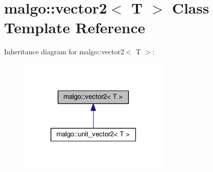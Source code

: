 \hypertarget{classmalgo_1_1vector2}{}\section{malgo\+:\+:vector2$<$ T $>$ Class Template Reference}
\label{classmalgo_1_1vector2}


Inheritance diagram for malgo\+:\+:vector2$<$ T $>$\+:
\nopagebreak
\begin{figure}[H]
\begin{center}
\leavevmode
\includegraphics[width=206pt]{classmalgo_1_1vector2__inherit__graph}
\end{center}
\end{figure}
